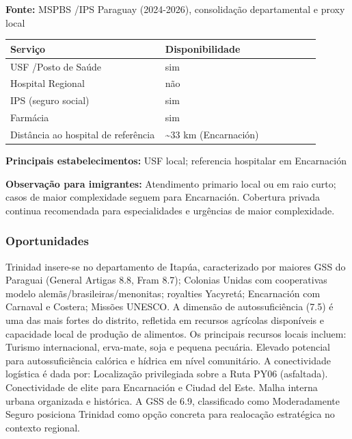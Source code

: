 \textbf{Fonte:} MSPBS /\allowbreak  IPS Paraguay (2024-2026), consolidação
departamental e proxy local

{\def\LTcaptype{none} %
\begin{longtable}{@{}>{\raggedright\arraybackslash}p{0.45\linewidth} >{\raggedright\arraybackslash}p{0.45\linewidth}@{}}
\toprule\noalign{}
Serviço & Disponibilidade \\
\midrule\noalign{}
\endhead
\bottomrule\noalign{}
\endlastfoot
USF /\allowbreak  Posto de Saúde & sim \\
Hospital Regional & não \\
IPS (seguro social) & sim \\
Farmácia & sim \\
Distância ao hospital de referência & \textasciitilde33 km
(Encarnación) \\
\end{longtable}
}

\textbf{Principais estabelecimentos:} USF local; referencia hospitalar
em Encarnación

\textbf{Observação para imigrantes:} Atendimento primario local ou em
raio curto; casos de maior complexidade seguem para Encarnación.
Cobertura privada continua recomendada para especialidades e urgências
de maior complexidade.
\newpage

\subsubsection*{Oportunidades}\label{oport-trinidad-0722}
Trinidad insere-se no departamento de Itapúa, caracterizado por maiores GSS do Paraguai (General Artigas 8.8, Fram 8.7); Colonias Unidas com cooperativas modelo alemãs/brasileiras/menonitas; royalties Yacyretá; Encarnación com Carnaval e Costera; Missões UNESCO. A dimensão de autossuficiência (7.5) é uma das mais fortes do distrito, refletida em recursos agrícolas disponíveis e capacidade local de produção de alimentos. Os principais recursos locais incluem: Turismo internacional, erva-mate, soja e pequena pecuária. Elevado potencial para autossuficiência calórica e hídrica em nível comunitário. A conectividade logística é dada por: Localização privilegiada sobre a Ruta PY06 (asfaltada). Conectividade de elite para Encarnación e Ciudad del Este. Malha interna urbana organizada e histórica. A GSS de 6.9, classificado como Moderadamente Seguro posiciona Trinidad como opção concreta para realocação estratégica no contexto regional.

